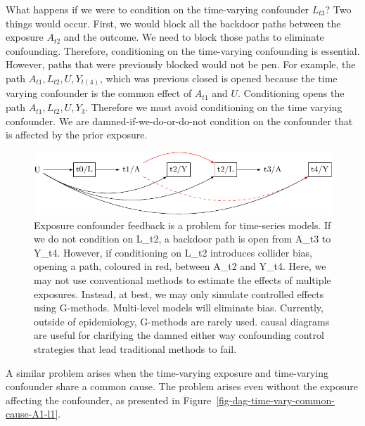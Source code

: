\documentclass[
  singlecolumn]{report}
\begin{document}
What happens if we were to condition on the time-varying confounder
\(L_{t3}\)? Two things would occur. First, we would block all the
backdoor paths between the exposure \(A_{t2}\) and the outcome. We need
to block those paths to eliminate confounding. Therefore, conditioning
on the time-varying confounding is essential. However, paths that were
previously blocked would not be pen. For example, the path
\(A_{t1}, L_{t2}, U, Y_{t(4)}\), which was previous closed is opened
because the time varying confounder is the common effect of \(A_{t1}\)
and \(U\). Conditioning opens the path \(A_{t1}, L_{t2}, U, Y_{3}\).
Therefore we must avoid conditioning on the time varying confounder. We
are damned-if-we-do-or-do-not condition on the confounder that is
affected by the prior exposure.

\begin{figure}

{\centering \includegraphics[width=1\textwidth,height=\textheight]{causal-dags_files/figure-pdf/fig-dag-9-1.pdf}

}

\caption{\label{fig-dag-9}Exposure confounder feedback is a problem for
time-series models. If we do not condition on L\_t2, a backdoor path is
open from A\_t3 to Y\_t4. However, if conditioning on L\_t2 introduces
collider bias, opening a path, coloured in red, between A\_t2 and Y\_t4.
Here, we may not use conventional methods to estimate the effects of
multiple exposures. Instead, at best, we may only simulate controlled
effects using G-methods. Multi-level models will eliminate bias.
Currently, outside of epidemiology, G-methods are rarely used. causal
diagrams are useful for clarifying the damned either way confounding
control strategies that lead traditional methods to fail.}

\end{figure}

A similar problem arises when the time-varying exposure and time-varying
confounder share a common cause. The problem arises even without the
exposure affecting the confounder, as presented in
Figure~\ref{fig-dag-time-vary-common-cause-A1-l1}.
\end{document}
